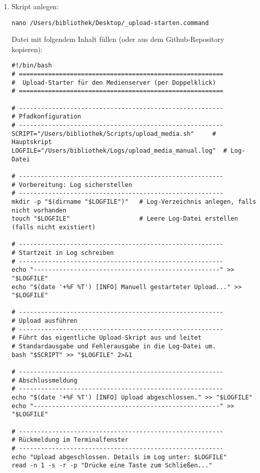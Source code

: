 \documentclass[12pt,a4paper]{report}
\begin{document}
  \begin{enumerate}
    \item Skript anlegen:

    \begin{verbatim}
nano /Users/bibliothek/Desktop/_upload-starten.command
    \end{verbatim}

    Datei mit folgendem Inhalt füllen (oder aus dem Github-Repository kopieren):

    \begin{verbatim}
#!/bin/bash
# ========================================================
#  Upload-Starter für den Medienserver (per Doppelklick)
# ========================================================

# --------------------------------------------------------
# Pfadkonfiguration
# --------------------------------------------------------
SCRIPT="/Users/bibliothek/Scripts/upload_media.sh"     # Hauptskript
LOGFILE="/Users/bibliothek/Logs/upload_media_manual.log"  # Log-Datei

# --------------------------------------------------------
# Vorbereitung: Log sicherstellen
# --------------------------------------------------------
mkdir -p "$(dirname "$LOGFILE")"   # Log-Verzeichnis anlegen, falls nicht vorhanden
touch "$LOGFILE"                   # Leere Log-Datei erstellen (falls nicht existiert)

# --------------------------------------------------------
# Startzeit in Log schreiben
# --------------------------------------------------------
echo "---------------------------------------------------" >> "$LOGFILE"
echo "$(date '+%F %T') [INFO] Manuell gestarteter Upload..." >> "$LOGFILE"

# --------------------------------------------------------
# Upload ausführen
# --------------------------------------------------------
# Führt das eigentliche Upload-Skript aus und leitet
# Standardausgabe und Fehlerausgabe in die Log-Datei um.
bash "$SCRIPT" >> "$LOGFILE" 2>&1

# --------------------------------------------------------
# Abschlussmeldung
# --------------------------------------------------------
echo "$(date '+%F %T') [INFO] Upload abgeschlossen." >> "$LOGFILE"
echo "---------------------------------------------------" >> "$LOGFILE"

# --------------------------------------------------------
# Rückmeldung im Terminalfenster
# --------------------------------------------------------
echo "Upload abgeschlossen. Details im Log unter: $LOGFILE"
read -n 1 -s -r -p "Drücke eine Taste zum Schließen..."
    \end{verbatim}


\end{enumerate}
\end{document}
